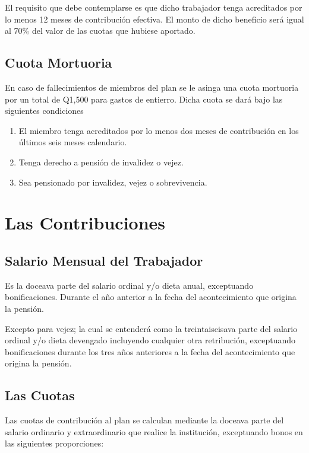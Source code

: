 \documentclass[12pt,letterpaper,titlepage]{article}
\begin{document}
El requisito que debe contemplarse es que dicho trabajador tenga acreditados por lo menos 12 meses de contribución efectiva. El monto de dicho beneficio será igual al 70\% del valor de las cuotas que hubiese aportado.

\subsection{Cuota Mortuoria}

En caso de fallecimientos de miembros del plan se le asinga una cuota mortuoria por un total de Q1,500 para gastos de entierro. Dicha cuota se dará bajo las siguientes condiciones 

\begin{enumerate}
	\item El miembro tenga acreditados por lo menos dos meses de contribución en los últimos seis meses calendario.
	\item Tenga derecho a pensión de invalidez o vejez.
	\item Sea pensionado por invalidez, vejez o sobrevivencia.
\end{enumerate}


\newpage

\section{Las Contribuciones}

\subsection{Salario Mensual del Trabajador}

Es la doceava parte del salario ordinal y/o dieta anual, exceptuando bonificaciones. Durante el año anterior a la fecha del acontecimiento que origina la pensión. 

Excepto para vejez; la cual se entenderá como la treintaiseisava parte del salario ordinal y/o dieta devengado incluyendo cualquier otra retribución, exceptuando bonificaciones durante los tres años anteriores a la fecha del acontecimiento que origina la pensión.

\subsection{Las Cuotas}

Las cuotas de contribución al plan se calculan mediante la doceava parte del salario ordinario y extraordinario que realice la institución, exceptuando bonos en las siguientes proporciones:
\end{document}
